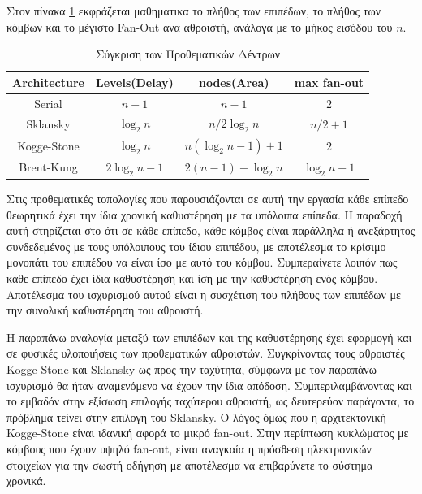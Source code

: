 Στον πίνακα \ref{Prefix_Comparison} εκφράζεται μαθηματικα το πλήθος των επιπέδων, το πλήθος των 
κόμβων και το μέγιστο Fan-Out ανα αθροιστή, ανάλογα με το μήκος εισόδου του $n$.
\begin{table}[H]
\centering
     \begin{tabular}{  c c c c  } 

        \hline
        Architecture & Levels(Delay) & nodes(Area) & max fan-out\\
        \hline
        
        Serial &
        $n-1$ &
        $n-1$ &
        $2$\\
        
        Sklansky &
        $\log_2 n$ &
        $n/2\log_2n$ &
        $n/2+1$\\
        
        Kogge-Stone &
        $\log_2n$ &
        $n(\log_2n-1)+1$ &
        $2$\\
        
        Brent-Kung &
        $2\log_2n-1$ &
        $ 2(n-1) - \log_2n $ &
        $\log_2n+1$\\
        
        \hline

    \end{tabular}

\caption{Σύγκριση των Προθεματικών Δέντρων}
\label{Prefix_Comparison}
\end{table}
Στις προθεματικές τοπολογίες που παρουσιάζονται σε αυτή την εργασία κάθε επίπεδο θεωρητικά έχει 
την ίδια χρονική καθυστέρηση με τα υπόλοιπα επίπεδα. Η παραδοχή αυτή στηρίζεται στο ότι 
σε κάθε επίπεδο, κάθε κόμβος είναι παράλληλα ή ανεξάρτητος συνδεδεμένος με τους υπόλοιπους
του ίδιου επιπέδου, με αποτέλεσμα το κρίσιμο μονοπάτι του επιπέδου να είναι ίσο με αυτό του
κόμβου. Συμπεραίνετε λοιπόν πως κάθε επίπεδο έχει ίδια καθυστέρηση και ίση με την καθυστέρηση
ενός κόμβου. Αποτέλεσμα του ισχυρισμού αυτού είναι η συσχέτιση του πλήθους των επιπέδων με 
την συνολική καθυστέρηση του αθροιστή.

Η παραπάνω αναλογία μεταξύ των επιπέδων και της καθυστέρησης έχει εφαρμογή και σε φυσικές
υλοποιήσεις των προθεματικών αθροιστών. Συγκρίνοντας τους αθροιστές Kogge-Stone και Sklansky ως
προς την ταχύτητα, σύμφωνα με τον παραπάνω ισχυρισμό θα ήταν αναμενόμενο να έχουν την ίδια 
απόδοση. Συμπεριλαμβάνοντας και το εμβαδόν στην εξίσωση επιλογής ταχύτερου αθροιστή, ως δευτερεύον
παράγοντα, το πρόβλημα τείνει στην επιλογή του Sklansky. Ο λόγος όμως που η αρχιτεκτονική 
Kogge-Stone είναι ιδανική αφορά το μικρό fan-out. Στην περίπτωση κυκλώματος με κόμβους
που έχουν υψηλό fan-out, είναι αναγκαία η πρόσθεση ηλεκτρονικών στοιχείων για την σωστή οδήγηση
με αποτέλεσμα να επιβαρύνετε το σύστημα χρονικά.














